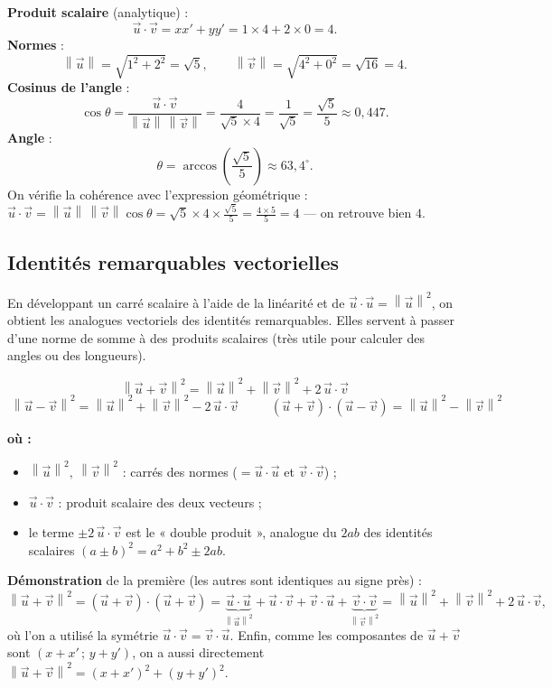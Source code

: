 \documentclass[11pt,a4paper]{article}
\newenvironment{ou}{%
  \par\smallskip\noindent\textbf{où :}\nopagebreak
  \begin{itemize}[leftmargin=1.8em,topsep=2pt,itemsep=1.5pt,parsep=0pt]}%
  {\end{itemize}}
\providecommand{\norm}[1]{\left\lVert #1\right\rVert}
\begin{document}
\begin{exemple}
\textbf{Produit scalaire} (analytique) :
\[
  \vec{u}\cdot\vec{v}=x x'+y y'=1\times 4+2\times 0=4.
\]
\textbf{Normes} :
\[
  \norm{\vec{u}}=\sqrt{1^2+2^2}=\sqrt{5},\qquad
  \norm{\vec{v}}=\sqrt{4^2+0^2}=\sqrt{16}=4.
\]
\textbf{Cosinus de l'angle} :
\[
  \cos\theta=\frac{\vec{u}\cdot\vec{v}}{\norm{\vec{u}}\,\norm{\vec{v}}}
  =\frac{4}{\sqrt{5}\times 4}=\frac{1}{\sqrt{5}}=\frac{\sqrt{5}}{5}\approx 0{,}447.
\]
\textbf{Angle} :
\[
  \theta=\arccos\!\left(\frac{\sqrt{5}}{5}\right)\approx 63{,}4^{\circ}.
\]
On vérifie la cohérence avec l'expression géométrique :
$\vec{u}\cdot\vec{v}=\norm{\vec{u}}\,\norm{\vec{v}}\cos\theta=\sqrt5\times4\times\frac{\sqrt5}{5}
=\frac{4\times5}{5}=4$ — on retrouve bien $4$.
\end{exemple}

\subsection{Identités remarquables vectorielles}

En développant un carré scalaire à l'aide de la linéarité et de $\vec{u}\cdot\vec{u}=\norm{\vec{u}}^2$,
on obtient les analogues vectoriels des identités remarquables. Elles servent à passer d'une norme de
somme à des produits scalaires (très utile pour calculer des angles ou des longueurs).

\begin{formule}
\[
  \boxed{\;\norm{\vec{u}+\vec{v}}^2=\norm{\vec{u}}^2+\norm{\vec{v}}^2+2\,\vec{u}\cdot\vec{v}\;}
\]
\[
  \boxed{\;\norm{\vec{u}-\vec{v}}^2=\norm{\vec{u}}^2+\norm{\vec{v}}^2-2\,\vec{u}\cdot\vec{v}\;}
  \qquad
  \boxed{\;(\vec{u}+\vec{v})\cdot(\vec{u}-\vec{v})=\norm{\vec{u}}^2-\norm{\vec{v}}^2\;}
\]
\begin{ou}
  \item $\norm{\vec{u}}^2,\ \norm{\vec{v}}^2$ : carrés des normes ($=\vec{u}\cdot\vec{u}$ et $\vec{v}\cdot\vec{v}$) ;
  \item $\vec{u}\cdot\vec{v}$ : produit scalaire des deux vecteurs ;
  \item le terme $\pm 2\,\vec{u}\cdot\vec{v}$ est le « double produit », analogue du $2ab$ des identités
        scalaires $(a\pm b)^2=a^2+b^2\pm 2ab$.
\end{ou}
\end{formule}

\textbf{Démonstration} de la première (les autres sont identiques au signe près) :
\[
  \norm{\vec{u}+\vec{v}}^2=(\vec{u}+\vec{v})\cdot(\vec{u}+\vec{v})
  =\underbrace{\vec{u}\cdot\vec{u}}_{\norm{\vec u}^2}+\vec{u}\cdot\vec{v}+\vec{v}\cdot\vec{u}
  +\underbrace{\vec{v}\cdot\vec{v}}_{\norm{\vec v}^2}
  =\norm{\vec{u}}^2+\norm{\vec{v}}^2+2\,\vec{u}\cdot\vec{v},
\]
où l'on a utilisé la symétrie $\vec{u}\cdot\vec{v}=\vec{v}\cdot\vec{u}$. Enfin, comme les composantes de
$\vec{u}+\vec{v}$ sont $(x+x'\,;\,y+y')$, on a aussi directement
$\norm{\vec{u}+\vec{v}}^2=(x+x')^2+(y+y')^2$.
\end{document}
